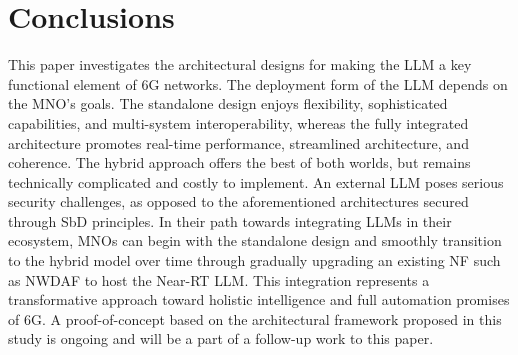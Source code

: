 \section{Conclusions}
\label{sec:conclusion}
This paper investigates the architectural designs for making the \gls{LLM} a key functional element of 6G networks. The deployment form of the \gls{LLM} depends on the \gls{MNO}'s goals. The standalone design enjoys flexibility, sophisticated capabilities, and multi-system interoperability, whereas the fully integrated architecture promotes real-time performance, streamlined architecture, and coherence. The hybrid approach offers the best of both worlds, but remains technically complicated and costly to implement. An external \gls{LLM} poses serious security challenges, as opposed to the aforementioned architectures secured through \gls{SbD} principles. In their path towards integrating \glspl{LLM} in their ecosystem, \glspl{MNO} can begin with the standalone design and smoothly transition to the hybrid model over time through gradually upgrading an existing \gls{NF} such as \gls{NWDAF} to host the \gls{Near-RT} \gls{LLM}. This integration represents a transformative approach toward holistic intelligence and full automation promises of 6G.  A proof-of-concept based on the architectural framework proposed in this study is ongoing and will be a part of a follow-up work to this paper. %


